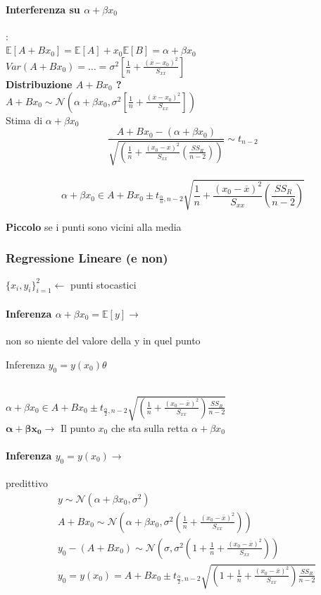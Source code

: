 \documentclass[]{article}
\newcommand{\ev}{\mathbb{E}[X]}
\renewcommand{\ev}[1]{\mathbb{E}[#1]}
\begin{document}
    \paragraph{Interferenza su $\alpha + \beta x_0$}: \\[2ex]
    $\ev{A+Bx_0} = \ev{A} + x_0 \ev{B} = \alpha + \beta x_0$ \\
    $Var(A+B x_0) = \ldots = \sigma^2[\frac{1}{n} + \frac{(\overline{x} - x_0)^2}{S_{xx}}]$ \\[3ex]
    \textbf{Distribuzione $A+B x_0$ ?} \\
    $A+B x_0 \sim \mathcal{N}(\alpha + \beta x_0, \sigma^2 [\frac{1}{n} + \frac{(\overline{x} - x_0)^2}{S_{xx}}])$ \\
    Stima di $\alpha + \beta x_0$ \\
    \[ \frac{A + B x_0 - (\alpha + \beta x_0)}{\sqrt{(\frac{1}{n} + \frac{(x_0 - x)^2}{S_{xx}}(\frac{SS_R}{n-2}))}} \sim t_{n-2} \] \\[2ex]
    \[ \alpha + \beta x_0 \in A + B x_0 \pm t_{\frac{\alpha}{n}, n-2} \sqrt{\frac{1}{n} + \frac{(x_0 - \overline{x})^2}{S_{xx}} (\frac{SS_R}{n-2})} \]
    \centerline{\textbf{Piccolo} se i punti sono vicini alla media}
    \subsubsection{Regressione Lineare (e non)}
    $\displaystyle \{ x_i, y_i \}^2_{i=1} \leftarrow$ punti stocastici \\
    \paragraph{Inferenza $\alpha + \beta x_0 = \ev{y} \rightarrow$} non so niente del valore della y in quel punto
    \centerline{Inferenza $y_0 = y(x_0) \theta$} \\[2ex]
    $\displaystyle\alpha + \beta x_0 \in A + B x_0 \pm t_{\frac{\alpha}{2}, n-2} \sqrt{(\frac{1}{n} + \frac{(x_0 - \overline{x})^2}{S_{xx}})\frac{SS_R}{n-2}}$ \\
    $\mathbf{\alpha + \beta x_0} \rightarrow$ Il punto $x_0$ che sta sulla retta $\alpha + \beta x_0$
    \paragraph{Inferenza $y_0 = y(x_0) \rightarrow$} predittivo
    \begin{equation*}
        \begin{aligned}
            & y \sim \mathcal{N}(\alpha + \beta x_0, \sigma^2) \\
            & A + B x_0 \sim \mathcal{N}(\alpha + \beta x_0, \sigma^2 (\frac{1}{n} + \frac{(x_0 - \overline{x})^2}{S_{xx}})) \\
            & y_0 - (A + B x_0) \sim \mathcal{N}(\sigma, \sigma^2 (1 + \frac{1}{n} + \frac{(x_0 - \overline{x})^2}{S_{xx}})) \\
            & y_0 = y(x_0) = A + B x_0 \pm t_{\frac{\alpha}{2}, n-2} \sqrt{(1 + \frac{1}{n} + \frac{(x_0 - \overline{x})^2}{S_{xx}}) \frac{SS_R}{n-2}}
        \end{aligned}
    \end{equation*}
\end{document}
